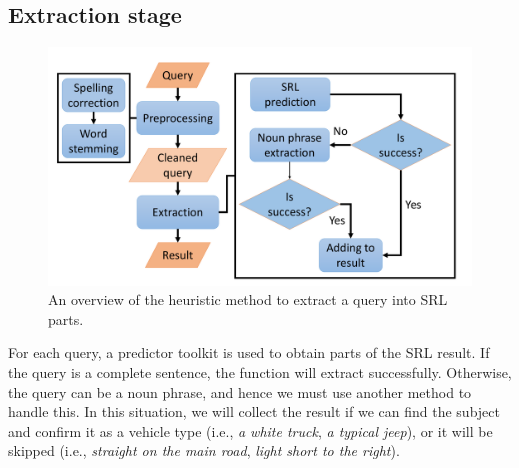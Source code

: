 \subsection{Extraction stage}
\begin{figure}[!htb]
    \centering
    \includegraphics[width=\textwidth]{resources/images/methods/stage_2_overview.pdf}
    \caption{An overview of the heuristic method to extract a query into SRL parts.}
    \label{fig:text_branch_stage_2_overview}
\end{figure}
For each query, a predictor toolkit is used to obtain parts of the SRL result. If the query is a complete sentence, the function will extract successfully. Otherwise, the query can be a noun phrase, and hence we must use another method to handle this. In this situation, we will collect the result if we can find the subject and confirm it as a vehicle type (i.e., \textit{a white truck}, \textit{a typical jeep}), or it will be skipped (i.e., \textit{straight on the main road}, \textit{light short to the right}).


